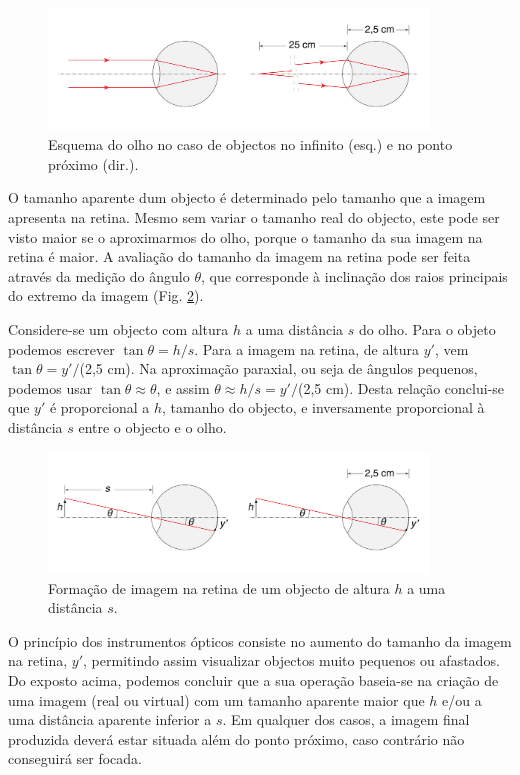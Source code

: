 \documentclass[a4paper,12pt]{article}      %
\begin{document}
\begin{figure}
	[!htb]  \centering 
	\includegraphics[width=0.9\textwidth]{olho-2}
	\caption{Esquema do olho no caso de objectos no infinito (esq.) e no ponto próximo (dir.). \label{fig:olho-2}} 
\end{figure}

O tamanho aparente dum objecto é determinado pelo tamanho que a imagem apresenta na retina. Mesmo sem variar o tamanho real do objecto, este pode ser visto maior se o aproximarmos do olho, porque o tamanho da sua imagem na retina é maior. A avaliação do tamanho da imagem na retina pode ser feita através da medição do ângulo $\theta$, que corresponde à inclinação dos raios principais do extremo da imagem (Fig. \ref{fig:olho-3}).

Considere-se um objecto com altura $h$ a uma distância $s$ do olho. Para o objeto podemos escrever $\tan\theta=h/s$. Para a imagem na retina, de altura $y'$, vem $\tan\theta = y' /$(2,5 cm). Na aproximação paraxial, ou seja de ângulos pequenos, podemos usar $\tan\theta \approx\theta$, e assim $\theta\approx h/s=y'/$(2,5 cm). Desta relação conclui-se que $y'$ é proporcional a $h$, tamanho do objecto, e inversamente proporcional à distância $s$ entre o objecto e o olho. 

\begin{figure}
	[!htb]  \centering 
	\includegraphics[width=0.9\textwidth]{olho-3}
	\caption{Formação de imagem na retina de um objecto de altura $h$ a uma distância $s$. \label{fig:olho-3}} 
\end{figure}

O princípio dos instrumentos ópticos consiste no aumento do tamanho da imagem na retina, $y'$, permitindo assim visualizar objectos muito pequenos ou afastados. Do exposto acima, podemos concluir que a sua operação baseia-se na criação de uma imagem (real ou virtual) com um tamanho aparente maior que $h$ e/ou 
 a uma distância aparente inferior a $s$. Em qualquer dos casos, a imagem final produzida deverá estar situada além do ponto próximo, caso contrário não conseguirá ser focada.
\end{document}
